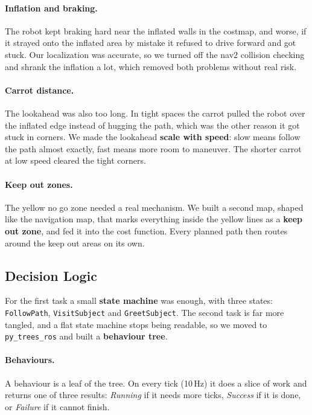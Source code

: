 \documentclass[a4paper, 11pt]{article}
\begin{document}
\paragraph{Inflation and braking.}
The robot kept braking hard near the inflated walls in the costmap, and worse, if it
strayed onto the inflated area by mistake it refused to drive forward and got stuck. Our
localization was accurate, so we turned off the nav2 collision checking and shrank the
inflation a lot, which removed both problems without real risk.

\paragraph{Carrot distance.}
The lookahead was also too long. In tight spaces the carrot pulled the robot over the
inflated edge instead of hugging the path, which was the other reason it got stuck in
corners. We made the lookahead \textbf{scale with speed}: slow means follow the path
almost exactly, fast means more room to maneuver. The shorter carrot at low speed cleared
the tight corners.

\paragraph{Keep out zones.}
The yellow no go zone needed a real mechanism. We built a second map, shaped like the
navigation map, that marks everything inside the yellow lines as a \textbf{keep out zone},
and fed it into the cost function. Every planned path then routes around the keep out
areas on its own.

\subsection{Decision Logic}\label{sec:decision}

For the first task a small \textbf{state machine} was enough, with three states:
\texttt{FollowPath}, \texttt{VisitSubject} and \texttt{GreetSubject}. The second task is
far more tangled, and a flat state machine stops being readable, so we moved to
\texttt{py\_trees\_ros} and built a \textbf{behaviour tree}.

\paragraph{Behaviours.}
A behaviour is a leaf of the tree. On every tick (10\,Hz) it does a slice of work and
returns one of three results: \emph{Running} if it needs more ticks, \emph{Success} if it
is done, or \emph{Failure} if it cannot finish.
\end{document}
